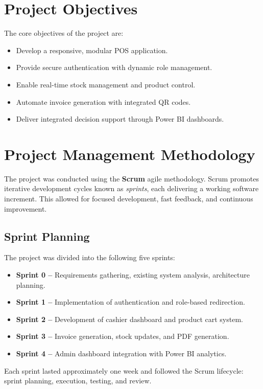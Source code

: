 \section{Project Objectives}

The core objectives of the project are:
\begin{itemize}
  \item Develop a responsive, modular POS application.
  \item Provide secure authentication with dynamic role management.
  \item Enable real-time stock management and product control.
  \item Automate invoice generation with integrated QR codes.
  \item Deliver integrated decision support through Power BI dashboards.
\end{itemize}

\section{Project Management Methodology}

The project was conducted using the \textbf{Scrum} agile methodology. Scrum promotes iterative development cycles known as \textit{sprints}, each delivering a working software increment. This allowed for focused development, fast feedback, and continuous improvement.

\subsection*{Sprint Planning}

The project was divided into the following five sprints:
\begin{itemize}
  \item \textbf{Sprint 0 –} Requirements gathering, existing system analysis, architecture planning.
  \item \textbf{Sprint 1 –} Implementation of authentication and role-based redirection.
  \item \textbf{Sprint 2 –} Development of cashier dashboard and product cart system.
  \item \textbf{Sprint 3 –} Invoice generation, stock updates, and PDF generation.
  \item \textbf{Sprint 4 –} Admin dashboard integration with Power BI analytics.
\end{itemize}

Each sprint lasted approximately one week and followed the Scrum lifecycle: sprint planning, execution, testing, and review.

